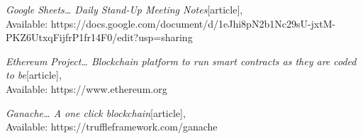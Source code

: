 \begin{thebibliography}{14}
\emph{Google Sheets… Daily Stand-Up Meeting Notes}[article],\\
Available: {https://docs.google.com/document/d/1eJhi8pN2b1Nc29sU-jxtM-PKZ6UtxqFijfrP1fr14F0/edit?usp=sharing}

\emph{Ethereum Project… Blockchain platform to run smart contracts as they are coded to be}[article],\\
Available: {https://www.ethereum.org}

\emph{Ganache… A one click blockchain}[article],\\
Available: {https://truffleframework.com/ganache}



\end{thebibliography}

